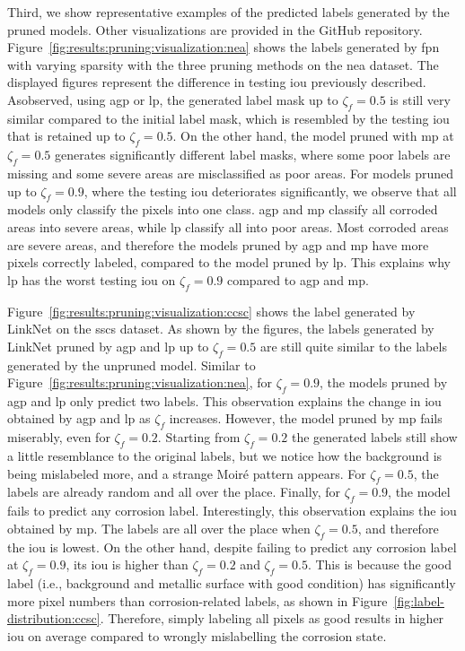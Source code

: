 \documentclass[mathematics,article,submit,pdftex,moreauthors]{Definitions/mdpi}
\begin{document}
Third, we show representative examples
of the predicted labels generated by the pruned
models. Other visualizations are provided in the GitHub repository.
Figure~\ref{fig:results:pruning:visualization:nea} 
shows the labels generated by \ac{fpn} 
with varying sparsity with the three pruning methods
on the \ac{nea} dataset. 
The displayed figures
represent the difference in testing \ac{iou}
previously described. Asobserved, 
using \ac{agp} or \ac{lp},
the generated label mask up to $\zeta_f=0.5$ is
still very similar compared to the initial label mask,
which is resembled by the testing \ac{iou}
that is retained up to $\zeta_f=0.5$. 
On the other hand, the model pruned with \ac{mp}
at $\zeta_f=0.5$ generates significantly different
label masks, where some poor labels are missing and
some severe areas are misclassified as poor areas.
For models pruned up to $\zeta_f=0.9$, where 
the testing \ac{iou} deteriorates significantly, 
we observe that all models only classify
the pixels into one class. \ac{agp} and \ac{mp}
classify all corroded areas into severe areas,
while \ac{lp} classify all into poor areas. Most
corroded areas are severe areas, and therefore 
the models pruned by \ac{agp} and \ac{mp}
have more pixels correctly labeled, compared to the model
pruned by \ac{lp}. This explains 
why \ac{lp} has the worst testing \ac{iou} on
$\zeta_f=0.9$ compared to \ac{agp} and \ac{mp}.

Figure~\ref{fig:results:pruning:visualization:ccsc}
shows the label generated by LinkNet on the \ac{sscs} dataset. 
As shown by the figures,
the labels generated by LinkNet pruned by \ac{agp}
and \ac{lp} up to $\zeta_f=0.5$ are still quite similar to the
labels generated by the unpruned model. Similar to 
Figure~\ref{fig:results:pruning:visualization:nea},
for $\zeta_f=0.9$, the models pruned by \ac{agp} and
\ac{lp} only predict two labels. This observation
explains the change in \ac{iou} obtained by \ac{agp}
and \ac{lp} as $\zeta_f$ increases. However,
the model pruned by \ac{mp} fails miserably, even
for $\zeta_f=0.2$. Starting from $\zeta_f=0.2$ the generated labels
still show a little resemblance to the original labels, but we
notice how the background is being mislabeled more,
and a strange Moir\'{e} pattern appears. For $\zeta_f=0.5$, the
labels are already random and all over the place. Finally,
for $\zeta_f=0.9$, the model fails to predict any corrosion 
label. Interestingly, this observation explains the
\ac{iou} obtained by \ac{mp}. The labels are all over the place
when $\zeta_f=0.5$, and therefore the \ac{iou} is lowest. On the other hand,
despite failing to predict any corrosion label at $\zeta_f=0.9$, its \ac{iou}
is higher than $\zeta_f=0.2$ and $\zeta_f=0.5$. This is because the
good label (i.e., background and metallic surface with good
condition) has significantly more pixel numbers than
corrosion-related labels, as shown in Figure~\ref{fig:label-distribution:ccsc}. 
Therefore, simply labeling all pixels as good results in higher \ac{iou} on average
compared to wrongly mislabelling the corrosion state.  
\end{document}
